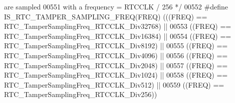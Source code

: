 \begin{DoxyCode}
{       are sampled}
00551 \textcolor{comment}{                                                                           with a frequency =  RTCCLK
       / 256   */}
00552 \textcolor{preprocessor}{#}\textcolor{preprocessor}{define} \textcolor{preprocessor}{IS\_RTC\_TAMPER\_SAMPLING\_FREQ}\textcolor{preprocessor}{(}\textcolor{preprocessor}{FREQ}\textcolor{preprocessor}{)} \textcolor{preprocessor}{(}\textcolor{preprocessor}{(}\textcolor{preprocessor}{(}\textcolor{preprocessor}{FREQ}\textcolor{preprocessor}{)} \textcolor{preprocessor}{==}
      RTC_TamperSamplingFreq_RTCCLK_Div32768\textcolor{preprocessor}{)} \textcolor{preprocessor}{||}
00553                                            \textcolor{preprocessor}{(}\textcolor{preprocessor}{(}\textcolor{preprocessor}{FREQ}\textcolor{preprocessor}{)} \textcolor{preprocessor}{==}
      RTC_TamperSamplingFreq_RTCCLK_Div16384\textcolor{preprocessor}{)} \textcolor{preprocessor}{||}
00554                                            \textcolor{preprocessor}{(}\textcolor{preprocessor}{(}\textcolor{preprocessor}{FREQ}\textcolor{preprocessor}{)} \textcolor{preprocessor}{==}
      RTC_TamperSamplingFreq_RTCCLK_Div8192\textcolor{preprocessor}{)} \textcolor{preprocessor}{||}
00555                                            \textcolor{preprocessor}{(}\textcolor{preprocessor}{(}\textcolor{preprocessor}{FREQ}\textcolor{preprocessor}{)} \textcolor{preprocessor}{==}
      RTC_TamperSamplingFreq_RTCCLK_Div4096\textcolor{preprocessor}{)} \textcolor{preprocessor}{||}
00556                                            \textcolor{preprocessor}{(}\textcolor{preprocessor}{(}\textcolor{preprocessor}{FREQ}\textcolor{preprocessor}{)} \textcolor{preprocessor}{==}
      RTC_TamperSamplingFreq_RTCCLK_Div2048\textcolor{preprocessor}{)} \textcolor{preprocessor}{||}
00557                                            \textcolor{preprocessor}{(}\textcolor{preprocessor}{(}\textcolor{preprocessor}{FREQ}\textcolor{preprocessor}{)} \textcolor{preprocessor}{==}
      RTC_TamperSamplingFreq_RTCCLK_Div1024\textcolor{preprocessor}{)} \textcolor{preprocessor}{||}
00558                                            \textcolor{preprocessor}{(}\textcolor{preprocessor}{(}\textcolor{preprocessor}{FREQ}\textcolor{preprocessor}{)} \textcolor{preprocessor}{==}
      RTC_TamperSamplingFreq_RTCCLK_Div512\textcolor{preprocessor}{)} \textcolor{preprocessor}{||}
00559                                            \textcolor{preprocessor}{(}\textcolor{preprocessor}{(}\textcolor{preprocessor}{FREQ}\textcolor{preprocessor}{)} \textcolor{preprocessor}{==}
      RTC_TamperSamplingFreq_RTCCLK_Div256\textcolor{preprocessor}{)}\textcolor{preprocessor}{)}

\end{DoxyCode}
